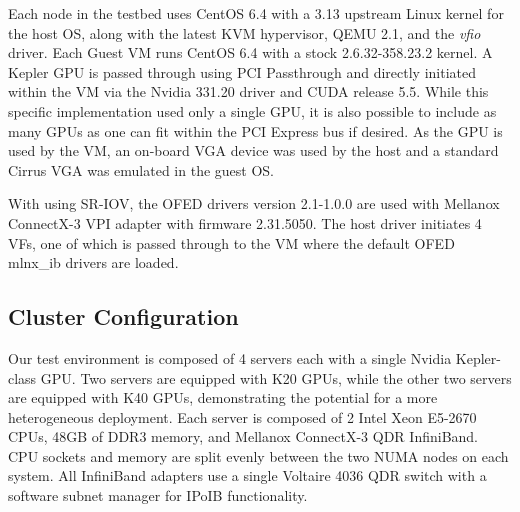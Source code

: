 Each node in the testbed uses CentOS 6.4 with a 3.13 upstream Linux kernel for the host OS, along with the latest KVM hypervisor, QEMU 2.1, and the \emph{vfio} driver.  Each Guest VM runs CentOS 6.4 with a stock 2.6.32-358.23.2 kernel. A Kepler GPU is passed through using PCI Passthrough and directly initiated within the VM via the Nvidia 331.20 driver and CUDA release 5.5. While this specific implementation used only a single GPU, it is also possible to include as many GPUs as one can fit within the PCI Express bus if desired. As the GPU is used by the VM, an on-board VGA device was used by the host and a standard Cirrus VGA was emulated in the guest OS. 

With using SR-IOV, the OFED drivers version 2.1-1.0.0 are used with Mellanox ConnectX-3 VPI adapter with firmware 2.31.5050.  The host driver initiates 4 VFs, one of which is passed through to the VM where the default OFED mlnx\_ib drivers are loaded.  




\subsection{Cluster Configuration}

Our test environment is composed of 4 servers each with a single Nvidia
Kepler-class GPU.  Two servers are equipped with K20 GPUs, while the other two
servers are equipped with K40 GPUs, demonstrating the potential for a more
heterogeneous deployment.  Each server is composed of 2 Intel Xeon E5-2670 CPUs,
48GB of DDR3 memory, and Mellanox ConnectX-3 QDR InfiniBand.  CPU sockets and
memory are split evenly between the two NUMA nodes on each system. All
InfiniBand adapters use a single Voltaire 4036 QDR switch with a software subnet
manager for IPoIB functionality.   


